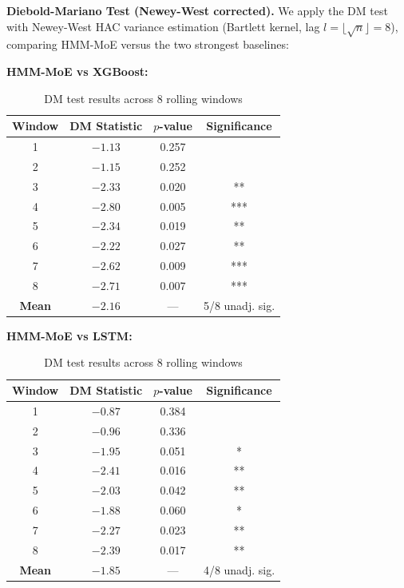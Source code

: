 \documentclass[3p,times]{elsarticle}
\begin{document}
\textbf{Diebold-Mariano Test (Newey-West corrected).} We apply the DM test with Newey-West HAC variance estimation (Bartlett kernel, lag $l = \lfloor\sqrt{n}\rfloor = 8$), comparing HMM-MoE versus the two strongest baselines:

\vspace{0.5em}
\noindent\textbf{HMM-MoE vs XGBoost:}

\begin{table}[htbp]
\centering
\caption{DM test results across 8 rolling windows}
\label{tab:dm-xgb}
\begin{tabular}{cccc}
\toprule
Window & DM Statistic & $p$-value & Significance \\
\midrule
1 & $-1.13$ & 0.257 &  \\
2 & $-1.15$ & 0.252 &  \\
3 & $-2.33$ & 0.020 & ** \\
4 & $-2.80$ & 0.005 & *** \\
5 & $-2.34$ & 0.019 & ** \\
6 & $-2.22$ & 0.027 & ** \\
7 & $-2.62$ & 0.009 & *** \\
8 & $-2.71$ & 0.007 & *** \\
\midrule
\textbf{Mean} & $\mathbf{-2.16}$ & --- & 5/8 unadj. sig. \\
\bottomrule
\end{tabular}
\end{table}

\vspace{0.5em}
\noindent\textbf{HMM-MoE vs LSTM:}

\begin{table}[htbp]
\centering
\caption{DM test results across 8 rolling windows}
\label{tab:dm-lstm}
\begin{tabular}{cccc}
\toprule
Window & DM Statistic & $p$-value & Significance \\
\midrule
1 & $-0.87$ & 0.384 &  \\
2 & $-0.96$ & 0.336 &  \\
3 & $-1.95$ & 0.051 & * \\
4 & $-2.41$ & 0.016 & ** \\
5 & $-2.03$ & 0.042 & ** \\
6 & $-1.88$ & 0.060 & * \\
7 & $-2.27$ & 0.023 & ** \\
8 & $-2.39$ & 0.017 & ** \\
\midrule
\textbf{Mean} & $\mathbf{-1.85}$ & --- & 4/8 unadj. sig. \\
\bottomrule
\end{tabular}
\end{table}
\end{document}
